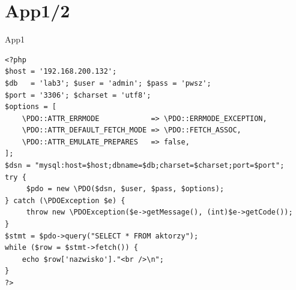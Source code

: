 \documentclass[presentation]{beamer}
\begin{document}
\section{App1/2}
\label{sec:orgddbd9c0}
\begin{frame}[label={sec:orgb6b4fac},fragile]{App1}
 \TINY
\begin{verbatim}
<?php
$host = '192.168.200.132';
$db   = 'lab3'; $user = 'admin'; $pass = 'pwsz';
$port = '3306'; $charset = 'utf8';
$options = [
    \PDO::ATTR_ERRMODE            => \PDO::ERRMODE_EXCEPTION,
    \PDO::ATTR_DEFAULT_FETCH_MODE => \PDO::FETCH_ASSOC,
    \PDO::ATTR_EMULATE_PREPARES   => false,
];
$dsn = "mysql:host=$host;dbname=$db;charset=$charset;port=$port";
try {
     $pdo = new \PDO($dsn, $user, $pass, $options);
} catch (\PDOException $e) {
     throw new \PDOException($e->getMessage(), (int)$e->getCode());
}
$stmt = $pdo->query("SELECT * FROM aktorzy");
while ($row = $stmt->fetch()) {
    echo $row['nazwisko']."<br />\n";
}
?>
\end{verbatim}
\end{frame}
\end{document}

